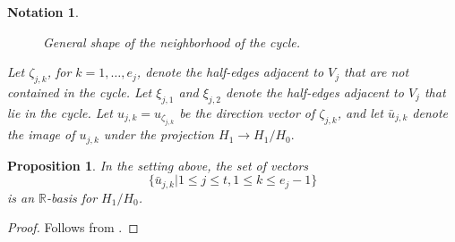 \documentclass{article}
\newtheorem{proposition}[definition]{Proposition}
\newtheorem{notation}[definition]{Notation}
\begin{document}
\begin{notation}
\begin{figure}[h]
        \caption{General shape of the neighborhood of the cycle.}
        \label{fig:shape-nbhd-cycle}
    \end{figure}
    
    Let $\zeta_{j,k}$, for $k = 1, \ldots, e_j$, denote the half-edges adjacent to $V_j$ that are not contained in the cycle. Let $\xi_{j,1}$ and $\xi_{j,2}$ denote the half-edges adjacent to $V_j$ that lie in the cycle. Let
    $
    u_{j,k} = u_{\zeta_{j,k}}
    $
    be the direction vector of $\zeta_{j,k}$, and let $\bar{u}_{j,k}$ denote the image of $u_{j,k}$ under the projection
    $
    H_1 \to H_1/H_0.
    $
\end{notation}


\begin{proposition}\label{prop: nbhd-cycle-span}
In the setting above, the set of vectors 
$$\{ \bar{u}_{j,k} | 1 \leq j \leq t, 1 \leq k \leq e_j - 1\}$$
is an $\mathbb{R}$-basis for $H_1/H_0$. 
\end{proposition}
\begin{proof}
    Follows from \cite[Proposition 3.2.18(b)]{Tor14}.
\end{proof}
\end{document}
